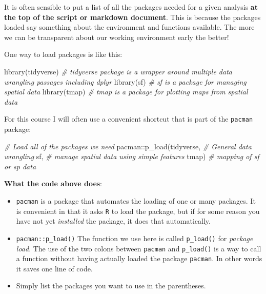 \documentclass[
]{book}
\newenvironment{Shaded}{\begin{snugshade}}{\end{snugshade}}
\newcommand{\CommentTok}[1]{\textcolor[rgb]{0.56,0.35,0.01}{\textit{#1}}}
\newcommand{\FunctionTok}[1]{\textcolor[rgb]{0.00,0.00,0.00}{#1}}
\newcommand{\NormalTok}[1]{#1}
\newcommand{\SpecialCharTok}[1]{\textcolor[rgb]{0.00,0.00,0.00}{#1}}
\providecommand{\tightlist}{%
  \setlength{\itemsep}{0pt}\setlength{\parskip}{0pt}}
\begin{document}
It is often sensible to put a list of all the packages needed for a given analysis \textbf{at the top of the script or markdown document}. This is because the packages loaded say something about the environment and functions available. The more we can be transparent about our working environment early the better!

One way to load packages is like this:

\begin{Shaded}
\begin{Highlighting}[]
\FunctionTok{library}\NormalTok{(tidyverse)   }\CommentTok{\# tidyverse package is a wrapper around multiple data wrangling passages including dplyr}
\FunctionTok{library}\NormalTok{(sf)          }\CommentTok{\# sf is a package for managing spatial data}
\FunctionTok{library}\NormalTok{(tmap)        }\CommentTok{\# tmap is a package for plotting maps from spatial data}
\end{Highlighting}
\end{Shaded}

For this course I will often use a convenient shortcut that is part of the \texttt{pacman} package:

\begin{Shaded}
\begin{Highlighting}[]
\CommentTok{\# Load all of the packages we need}
\NormalTok{pacman}\SpecialCharTok{::}\FunctionTok{p\_load}\NormalTok{(tidyverse,   }\CommentTok{\# General data wrangling}
\NormalTok{               sf,          }\CommentTok{\# manage spatial data using simple features}
\NormalTok{               tmap)        }\CommentTok{\# mapping of sf or sp data}
\end{Highlighting}
\end{Shaded}

\textbf{What the code above does}:

\begin{itemize}
\tightlist
\item
  \texttt{pacman} is a package that automates the loading of one or many packages. It is convenient in that it asks \texttt{R} to load the package, but if for some reason you have not yet \emph{installed} the package, it does that automatically.
\item
  \texttt{pacman::p\_load()} The function we use here is called \texttt{p\_load()} for \emph{package load}. The use of the two colons between \texttt{pacman} and \texttt{p\_load()} is a way to call a function without having actually loaded the package \texttt{pacman}. In other words it saves one line of code.
\item
  Simply list the packages you want to use in the parentheses.
\end{itemize}
\end{document}
